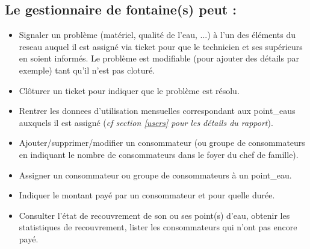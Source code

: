 \documentclass[a4paper, 11pt]{article}
\begin{document}
\subsection{Le gestionnaire de \gls{fontaine}(s) peut :}
\begin{itemize}
  \item Signaler un problème (matériel, qualité de l'eau, ...) à l'un des éléments du \gls{reseau} auquel il est assigné via \gls{ticket} pour que le technicien et ses supérieurs en soient informés. Le problème est modifiable (pour ajouter des détails par exemple) tant qu'il n'est pas cloturé.
  \item Clôturer un \gls{ticket} pour indiquer que le problème est résolu.
  \item Rentrer les \glspl{donnee} d'utilisation mensuelles correspondant aux \glspl{point_eau} auxquels il est assigné (\emph{cf section \ref{users} pour les détails du rapport}).
  \item Ajouter/supprimer/modifier un \gls{consommateur} (ou groupe de \glspl{consommateur} en indiquant le nombre de \glspl{consommateur} dans le foyer du chef de famille).
  \item Assigner un \gls{consommateur} ou groupe de \glspl{consommateur} à un \gls{point_eau}.
  \item Indiquer le montant payé par un \gls{consommateur} et pour quelle durée.
  \item Consulter l'état de recouvrement de son ou ses point(s) d'eau, obtenir les statistiques de recouvrement, lister les \glspl{consommateur} qui n'ont pas encore payé.
\end{itemize}

\end{document}
